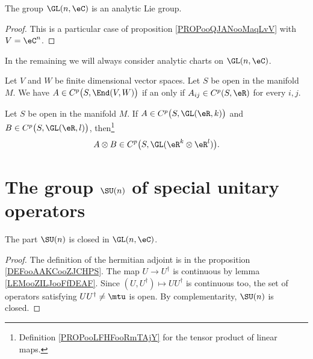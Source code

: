 \begin{proposition}     \label{PROPooWRVKooLfqLfV}
	The group \( \GL(n,\eC)\) is an analytic Lie group.
\end{proposition}

\begin{proof}
	This is a particular case of proposition \ref{PROPooQJANooMaqLvV} with \( V=\eC^n\).
\end{proof}


In the remaining we will always consider analytic charts on \( \GL(n,\eC)\).

\begin{proposition}		\label{PROPooRRNXooXJZYSB}
	Let \( V\) and \( W\) be finite dimensional vector spaces. Let \( S\) be open in the manifold \( M\). We have \( A\in C^p\big( S,\End(V,W) \big) \) if an only if \( A_{ij}\in C^p(S,\eR)\) for every \( i,j\).
\end{proposition}
\noproof

\begin{proposition}		\label{PROPooLANVooKPiLuu}
	Let \( S\) be open in the manifold \( M\). If \( A\in C^{p}\big( S,\GL(\eR,k) \big)\) and \( B\in C^{p}\big( S,\GL(\eR,l) \big)\), then\footnote{Definition \ref{PROPooLFHFooRmTAjY} for the tensor product of linear maps.}
	\begin{equation}
		A\otimes B\in C^{p}\big( S,\GL(\eR^k\otimes \eR^l) \big).
	\end{equation}
\end{proposition}
\noproof

\section{The group \texorpdfstring{$ \SU(n)$}{SUn} of special unitary operators}

\begin{lemma}        \label{LEMooKFQOooBVtyoW}
	The part \( \SU(n)\) is closed in \( \GL(n,\eC)\).
\end{lemma}

\begin{proof}
	The definition of the hermitian adjoint is in the proposition \ref{DEFooAAKCooZJCHPS}. The map \( U\to U^{\dag}\) is continuous by lemma \ref{LEMooZILJooFfDEAF}. Since \( (U,U^{\dag})\mapsto UU^{\dag}\) is continuous too, the set of operators satisfying \( UU^{\dag}\neq\mtu\) is open. By complementarity, \( \SU(n)\) is closed.
\end{proof}


